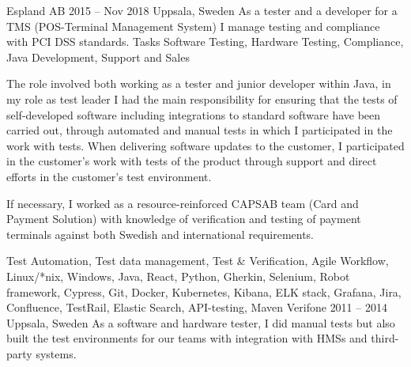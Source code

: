 \documentclass{sobCV}[2015/09/08]
\begin{document}
   {Espland AB}
   {2015 -- Nov 2018}
   {Uppsala, Sweden}{
       As a tester and a developer for a TMS (POS-Terminal Management System) I
       manage testing and compliance with PCI DSS standards.
   }
   {Tasks}{
       Software Testing,
       Hardware Testing,
       Compliance, 
       Java Development,
       Support and Sales
 }{  %
      {
          The role involved both working as a tester and junior developer within
          Java, in my role as test leader I had the main responsibility for
          ensuring that the tests of self-developed software including
          integrations to standard software have been carried out, through
          automated and manual tests in which I participated in the work with
          tests.  When delivering software updates to the customer, I
          participated in the customer's work with tests of the product through
          support and direct efforts in the customer's test environment.  

          If necessary, I worked as a  resource-reinforced CAPSAB team (Card
          and Payment Solution) with knowledge of verification and testing of
          payment terminals against both Swedish and international
          requirements.
     }
 }{
       Test Automation,
       Test data management,
       Test \& Verification,
       Agile Workflow, 
       Linux/*nix, 
       Windows, 
       Java, 
       React, 
       Python, 
       Gherkin, 
       Selenium, 
       Robot framework,
       Cypress, 
       Git, 
       Docker, 
       Kubernetes, 
       Kibana, 
       ELK stack, 
       Grafana, 
       Jira, 
       Confluence, 
       TestRail, 
       Elastic Search, 
       API-testing, 
       Maven 
}
   {Verifone}
   {2011 -- 2014}
   {Uppsala, Sweden}{
       As a software and hardware tester, I did manual tests but also built the
       test environments for our teams with integration with HMSs and
       third-party systems.
   }
\end{document}
